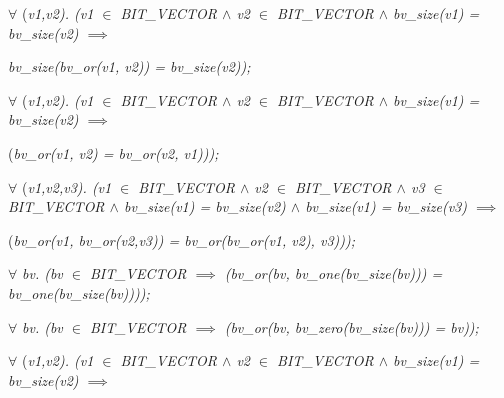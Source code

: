 \begin{sloppypar}
\hspace*{0.20in} $\forall$  \rm (\it v1\rm ,\it v2\rm )\rm . \rm (\it v1  $\in$  \it BIT\_VECTOR  $\land$  \it v2  $\in$  \it BIT\_VECTOR  $\land$  \it bv\_size\rm (\it v1\rm ) \rm = \it bv\_size\rm (\it v2\rm )  $\implies$  

\hspace*{0.60in}\it bv\_size\rm (\it bv\_or\rm (\it v1\rm , \it v2\rm )\rm ) \rm = \it bv\_size\rm (\it v2\rm )\rm )\rm ;

\hspace*{0.20in} $\forall$  \rm (\it v1\rm ,\it v2\rm )\rm . \rm (\it v1  $\in$  \it BIT\_VECTOR  $\land$  \it v2  $\in$  \it BIT\_VECTOR  $\land$  \it bv\_size\rm (\it v1\rm ) \rm = \it bv\_size\rm (\it v2\rm )  $\implies$  

\hspace*{0.60in}\rm (\it bv\_or\rm (\it v1\rm , \it v2\rm ) \rm = \it bv\_or\rm (\it v2\rm , \it v1\rm )\rm )\rm )\rm ;

\hspace*{0.20in} $\forall$  \rm (\it v1\rm ,\it v2\rm ,\it v3\rm )\rm . \rm (\it v1  $\in$  \it BIT\_VECTOR  $\land$  \it v2  $\in$  \it BIT\_VECTOR $\land$  \it v3  $\in$  \it BIT\_VECTOR  $\land$  \it bv\_size\rm (\it v1\rm ) \rm = \it bv\_size\rm (\it v2\rm )  $\land$  \it bv\_size\rm (\it v1\rm ) \rm = \it bv\_size\rm (\it v3\rm )  $\implies$  

\hspace*{0.60in}\rm (\it bv\_or\rm (\it v1\rm , \it bv\_or\rm (\it v2\rm ,\it v3\rm )\rm ) \rm = \it bv\_or\rm (\it bv\_or\rm (\it v1\rm , \it v2\rm )\rm , \it v3\rm )\rm )\rm )\rm ;

\hspace*{0.20in} $\forall$  \it bv\rm . \rm (\it bv  $\in$  \it BIT\_VECTOR  $\implies$  \rm (\it bv\_or\rm (\it bv\rm , \it bv\_one\rm (\it bv\_size\rm (\it bv\rm )\rm )\rm ) \rm = \it bv\_one\rm (\it bv\_size\rm (\it bv\rm )\rm )\rm )\rm )\rm ;

\hspace*{0.20in} $\forall$  \it bv\rm . \rm (\it bv  $\in$  \it BIT\_VECTOR  $\implies$  \rm (\it bv\_or\rm (\it bv\rm , \it bv\_zero\rm (\it bv\_size\rm (\it bv\rm )\rm )\rm ) \rm = \it bv\rm )\rm )\rm ;

\vspace*{4mm}
\hspace*{0.20in} $\forall$  \rm (\it v1\rm ,\it v2\rm )\rm . \rm (\it v1  $\in$  \it BIT\_VECTOR  $\land$  \it v2  $\in$  \it BIT\_VECTOR  $\land$  \it bv\_size\rm (\it v1\rm ) \rm = \it bv\_size\rm (\it v2\rm )  $\implies$  


\end{sloppypar}
